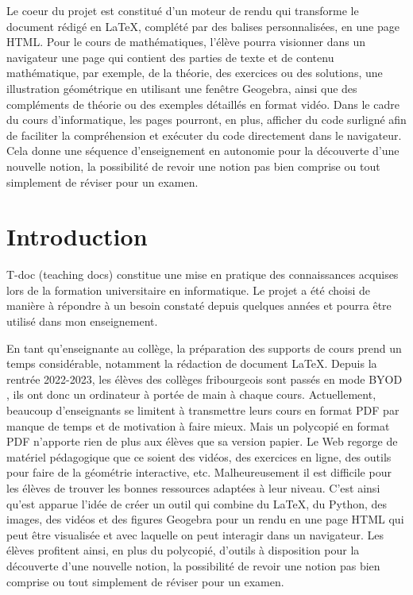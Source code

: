 \documentclass[12pt,titlepage,oneside]{article}
\renewcommand{\footnote}[1]{}
\begin{document}
Le coeur du projet est constitué d'un moteur de rendu qui transforme le document rédigé en LaTeX, complété par des balises personnalisées, en une page HTML.  Pour le cours de mathématiques, l'élève pourra visionner dans un navigateur une page qui contient des parties de texte et de contenu mathématique, par exemple, de la théorie, des exercices ou des solutions, une illustration géométrique en utilisant une fenêtre Geogebra, ainsi que des compléments de théorie ou des exemples détaillés en format vidéo. Dans le cadre du cours d'informatique, les pages pourront, en plus, afficher du code surligné afin de faciliter la compréhension et exécuter du code directement dans le navigateur. Cela donne une séquence d'enseignement en autonomie pour la découverte d'une nouvelle notion, la possibilité de revoir une notion pas bien comprise ou tout simplement de réviser pour un examen.

\newpage

\tableofcontents
\thispagestyle{empty}

\clearpage

\setcounter{page}{1}
\section*{Introduction}
T-doc (teaching docs) constitue une mise en pratique des connaissances acquises lors de la formation universitaire en informatique. Le projet a été choisi de manière à répondre à un besoin constaté depuis quelques années et pourra être utilisé dans mon enseignement.\par

En tant qu'enseignante au collège, la préparation des supports de cours prend un temps considérable, notamment la rédaction de document LaTeX. Depuis la rentrée 2022-2023, les élèves des collèges fribourgeois sont passés en mode BYOD \footnote{Bring Your Own Device}, ils ont donc un ordinateur à portée de main à chaque cours. Actuellement, beaucoup d'enseignants se limitent à transmettre leurs cours en format PDF par manque de temps et de motivation à faire mieux. Mais un polycopié en format PDF n'apporte rien de plus aux élèves que sa version papier. Le Web regorge de matériel pédagogique que ce soient des vidéos, des exercices en ligne, des outils pour faire de la géométrie interactive, etc. Malheureusement il est difficile pour les élèves de trouver les bonnes ressources adaptées à leur niveau. C'est ainsi qu'est apparue l'idée de créer un outil qui combine du LaTeX, du Python, des images, des vidéos et des figures Geogebra pour un rendu en une page HTML qui peut être visualisée et avec laquelle on peut interagir dans un navigateur. Les élèves profitent ainsi, en plus du polycopié, d'outils à disposition pour la découverte d'une nouvelle notion, la possibilité de revoir une notion pas bien comprise ou tout simplement de réviser pour un examen.\par
\end{document}
